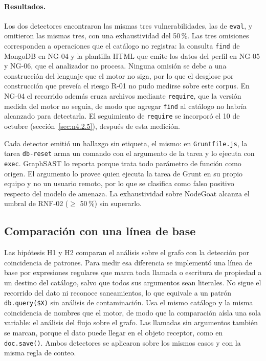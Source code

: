 \paragraph{Resultados.} Los dos detectores encontraron las mismas tres
vulnerabilidades, las de \texttt{eval}, y omitieron las mismas tres, con
una exhaustividad del 50\,\%. Las tres omisiones corresponden a
operaciones que el catálogo no registra: la consulta \texttt{find} de
MongoDB en NG-04 y la plantilla HTML que emite los datos del perfil en
NG-05 y NG-06, que el analizador no procesa. Ninguna omisión se debe a
una construcción del lenguaje que el motor no siga, por lo que el
desglose por construcción que preveía el riesgo R-01 no pudo medirse
sobre este corpus. En NG-04 el recorrido además cruza archivos mediante
\texttt{require}, que la versión medida del motor no seguía, de modo que
agregar \texttt{find} al catálogo no habría alcanzado para detectarla. El
seguimiento de \texttt{require} se incorporó el 10 de octubre
(sección~\ref{sec:n4.2.5}), después de esta medición.

Cada detector emitió un hallazgo sin etiqueta, el mismo: en
\texttt{Gruntfile.js}, la tarea \texttt{db-reset} arma un comando con el
argumento de la tarea y lo ejecuta con \texttt{exec}. GraphSAST lo
reporta porque trata todo parámetro de función como origen. El argumento
lo provee quien ejecuta la tarea de Grunt en su propio equipo y no un
usuario remoto, por lo que se clasifica como falso positivo respecto del
modelo de amenaza. La exhaustividad sobre NodeGoat alcanza el umbral de
RNF-02 ($\geq$ 50\,\%) sin superarlo.

\subsection{Comparación con una línea de base}\label{sec:linea-base}

Las hipótesis H1 y H2 comparan el análisis sobre el grafo con la
detección por coincidencia de patrones. Para medir esa diferencia se
implementó una línea de base por expresiones regulares que marca toda
llamada o escritura de propiedad a un destino del catálogo, salvo que
todos sus argumentos sean literales. No sigue el recorrido del dato ni
reconoce saneamientos, lo que equivale a un patrón
\texttt{db.query(\$X)} sin análisis de contaminación. Usa el mismo
catálogo y la misma coincidencia de nombres que el motor, de modo que la
comparación aísla una sola variable: el análisis del flujo sobre el
grafo. Las llamadas sin argumentos también se marcan, porque el dato
puede llegar en el objeto receptor, como en \texttt{doc.save()}. Ambos
detectores se aplicaron sobre los mismos casos y con la misma regla de
conteo.


